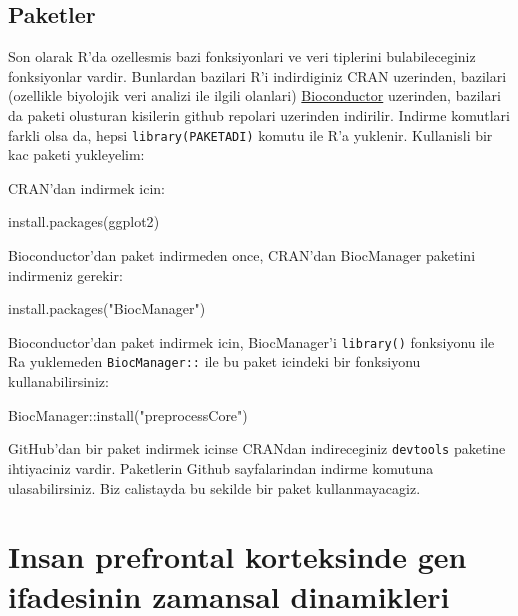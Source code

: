 \documentclass[
]{book}
\newenvironment{Shaded}{\begin{snugshade}}{\end{snugshade}}
\newcommand{\FunctionTok}[1]{\textcolor[rgb]{0.00,0.00,0.00}{#1}}
\newcommand{\NormalTok}[1]{#1}
\newcommand{\SpecialCharTok}[1]{\textcolor[rgb]{0.00,0.00,0.00}{#1}}
\newcommand{\StringTok}[1]{\textcolor[rgb]{0.31,0.60,0.02}{#1}}
\begin{document}
\hypertarget{paketler}{%
\section{Paketler}\label{paketler}}

Son olarak R'da ozellesmis bazi fonksiyonlari ve veri tiplerini bulabileceginiz fonksiyonlar vardir. Bunlardan bazilari R'i indirdiginiz CRAN uzerinden, bazilari (ozellikle biyolojik veri analizi ile ilgili olanlari) \href{https://www.bioconductor.org/}{Bioconductor} uzerinden, bazilari da paketi olusturan kisilerin github repolari uzerinden indirilir. Indirme komutlari farkli olsa da, hepsi \texttt{library(PAKETADI)} komutu ile R'a yuklenir. Kullanisli bir kac paketi yukleyelim:

CRAN'dan indirmek icin:

\begin{Shaded}
\begin{Highlighting}[]
\FunctionTok{install.packages}\NormalTok{(}\StringTok{\textquotesingle{}ggplot2\textquotesingle{}}\NormalTok{)}
\end{Highlighting}
\end{Shaded}

Bioconductor'dan paket indirmeden once, CRAN'dan BiocManager paketini indirmeniz gerekir:

\begin{Shaded}
\begin{Highlighting}[]
\FunctionTok{install.packages}\NormalTok{(}\StringTok{"BiocManager"}\NormalTok{)}
\end{Highlighting}
\end{Shaded}

Bioconductor'dan paket indirmek icin, BiocManager'i \texttt{library()} fonksiyonu ile Ra yuklemeden \texttt{BiocManager::} ile bu paket icindeki bir fonksiyonu kullanabilirsiniz:

\begin{Shaded}
\begin{Highlighting}[]
\NormalTok{BiocManager}\SpecialCharTok{::}\FunctionTok{install}\NormalTok{(}\StringTok{"preprocessCore"}\NormalTok{)}
\end{Highlighting}
\end{Shaded}

GitHub'dan bir paket indirmek icinse CRANdan indireceginiz \texttt{devtools} paketine ihtiyaciniz vardir. Paketlerin Github sayfalarindan indirme komutuna ulasabilirsiniz. Biz calistayda bu sekilde bir paket kullanmayacagiz.

\hypertarget{insan-prefrontal-korteksinde-gen-ifadesinin-zamansal-dinamikleri}{%
\chapter{Insan prefrontal korteksinde gen ifadesinin zamansal dinamikleri}\label{insan-prefrontal-korteksinde-gen-ifadesinin-zamansal-dinamikleri}}
\end{document}
